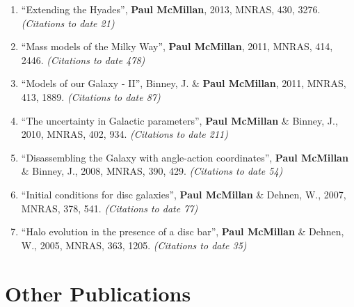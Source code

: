 \documentclass{resume}
\begin{document}
\begin{enumerate}
\item ``Extending the Hyades'', \textbf{Paul McMillan}, 2013, MNRAS, 430, 3276. \textit{(Citations to date 21)}

\item ``Mass models of the Milky Way'', \textbf{Paul McMillan}, 2011, MNRAS, 414, 2446. \textit{(Citations to date 478)}

\item ``Models of our Galaxy - II'', Binney, J. \& \textbf{Paul McMillan}, 2011, MNRAS, 413, 1889. \textit{(Citations to date 87)}

\item ``The uncertainty in Galactic parameters'', \textbf{Paul McMillan} \& Binney, J., 2010, MNRAS, 402, 934. \textit{(Citations to date 211)}

\item ``Disassembling the Galaxy with angle-action coordinates'', \textbf{Paul McMillan} \& Binney, J., 2008, MNRAS, 390, 429. \textit{(Citations to date 54)}

\item ``Initial conditions for disc galaxies'', \textbf{Paul McMillan} \& Dehnen, W., 2007, MNRAS, 378, 541. \textit{(Citations to date 77)}

\item ``Halo evolution in the presence of a disc bar'', \textbf{Paul McMillan} \& Dehnen, W., 2005, MNRAS, 363, 1205. \textit{(Citations to date 35)}

\end{enumerate}\section*{Other Publications}
\end{document}
